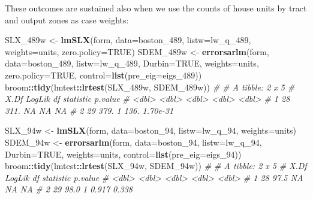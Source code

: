 \documentclass[]{book}
\newenvironment{Shaded}{\begin{snugshade}}{\end{snugshade}}
\newcommand{\CommentTok}[1]{\textcolor[rgb]{0.56,0.35,0.01}{\textit{#1}}}
\newcommand{\DataTypeTok}[1]{\textcolor[rgb]{0.13,0.29,0.53}{#1}}
\newcommand{\DecValTok}[1]{\textcolor[rgb]{0.00,0.00,0.81}{#1}}
\newcommand{\KeywordTok}[1]{\textcolor[rgb]{0.13,0.29,0.53}{\textbf{#1}}}
\newcommand{\NormalTok}[1]{#1}
\newcommand{\OperatorTok}[1]{\textcolor[rgb]{0.81,0.36,0.00}{\textbf{#1}}}
\newcommand{\OtherTok}[1]{\textcolor[rgb]{0.56,0.35,0.01}{#1}}
\newcommand{\StringTok}[1]{\textcolor[rgb]{0.31,0.60,0.02}{#1}}
\begin{document}
These outcomes are sustained also when we use the counts of house units by tract and output zones as case weights:

\begin{Shaded}
\begin{Highlighting}[]
\NormalTok{SLX_489w <-}\StringTok{ }\KeywordTok{lmSLX}\NormalTok{(form, }\DataTypeTok{data=}\NormalTok{boston_}\DecValTok{489}\NormalTok{, }\DataTypeTok{listw=}\NormalTok{lw_q_}\DecValTok{489}\NormalTok{, }\DataTypeTok{weights=}\NormalTok{units, }\DataTypeTok{zero.policy=}\OtherTok{TRUE}\NormalTok{)}
\NormalTok{SDEM_489w <-}\StringTok{ }\KeywordTok{errorsarlm}\NormalTok{(form, }\DataTypeTok{data=}\NormalTok{boston_}\DecValTok{489}\NormalTok{, }\DataTypeTok{listw=}\NormalTok{lw_q_}\DecValTok{489}\NormalTok{, }\DataTypeTok{Durbin=}\OtherTok{TRUE}\NormalTok{,}
    \DataTypeTok{weights=}\NormalTok{units, }\DataTypeTok{zero.policy=}\OtherTok{TRUE}\NormalTok{, }\DataTypeTok{control=}\KeywordTok{list}\NormalTok{(}\DataTypeTok{pre_eig=}\NormalTok{eigs_}\DecValTok{489}\NormalTok{))}
\NormalTok{broom}\OperatorTok{::}\KeywordTok{tidy}\NormalTok{(lmtest}\OperatorTok{::}\KeywordTok{lrtest}\NormalTok{(SLX_489w, SDEM_489w))}
\CommentTok{# # A tibble: 2 x 5}
\CommentTok{#    X.Df LogLik    df statistic   p.value}
\CommentTok{#   <dbl>  <dbl> <dbl>     <dbl>     <dbl>}
\CommentTok{# 1    28   311.    NA       NA  NA       }
\CommentTok{# 2    29   379.     1      136.  1.70e-31}
\end{Highlighting}
\end{Shaded}

\begin{Shaded}
\begin{Highlighting}[]
\NormalTok{SLX_94w <-}\StringTok{ }\KeywordTok{lmSLX}\NormalTok{(form, }\DataTypeTok{data=}\NormalTok{boston_}\DecValTok{94}\NormalTok{, }\DataTypeTok{listw=}\NormalTok{lw_q_}\DecValTok{94}\NormalTok{, }\DataTypeTok{weights=}\NormalTok{units)}
\NormalTok{SDEM_94w <-}\StringTok{ }\KeywordTok{errorsarlm}\NormalTok{(form, }\DataTypeTok{data=}\NormalTok{boston_}\DecValTok{94}\NormalTok{, }\DataTypeTok{listw=}\NormalTok{lw_q_}\DecValTok{94}\NormalTok{, }\DataTypeTok{Durbin=}\OtherTok{TRUE}\NormalTok{, }\DataTypeTok{weights=}\NormalTok{units,}
                       \DataTypeTok{control=}\KeywordTok{list}\NormalTok{(}\DataTypeTok{pre_eig=}\NormalTok{eigs_}\DecValTok{94}\NormalTok{))}
\NormalTok{broom}\OperatorTok{::}\KeywordTok{tidy}\NormalTok{(lmtest}\OperatorTok{::}\KeywordTok{lrtest}\NormalTok{(SLX_94w, SDEM_94w))}
\CommentTok{# # A tibble: 2 x 5}
\CommentTok{#    X.Df LogLik    df statistic p.value}
\CommentTok{#   <dbl>  <dbl> <dbl>     <dbl>   <dbl>}
\CommentTok{# 1    28   97.5    NA    NA      NA    }
\CommentTok{# 2    29   98.0     1     0.917   0.338}
\end{Highlighting}
\end{Shaded}
\end{document}
